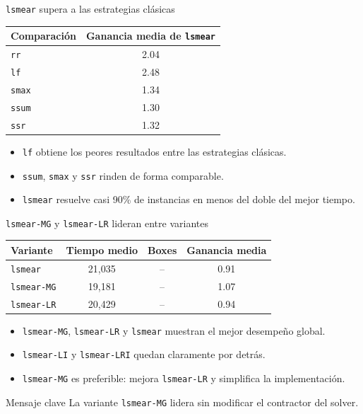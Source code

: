 \documentclass[10pt,aspectratio=169]{beamer}
\begin{document}
\begin{frame}{\texttt{lsmear} supera a las estrategias clásicas}
\small
\begin{center}
\begin{tabular}{@{}lc@{}}
\toprule
Comparación & Ganancia media de \texttt{lsmear} \\
\midrule
\texttt{rr}   & 2.04 \\
\texttt{lf}   & 2.48 \\
\texttt{smax} & 1.34 \\
\texttt{ssum} & \alert{1.30} \\
\texttt{ssr}  & 1.32 \\
\bottomrule
\end{tabular}
\end{center}

\begin{itemize}
  \item \texttt{lf} obtiene los peores resultados entre las estrategias clásicas.
  \item \texttt{ssum}, \texttt{smax} y \texttt{ssr} rinden de forma comparable.
  \item \texttt{lsmear} resuelve casi 90\% de instancias en menos del doble del mejor tiempo.
\end{itemize}
\end{frame}

\begin{frame}{\texttt{lsmear-MG} y \texttt{lsmear-LR} lideran entre variantes}
\small
\begin{center}
\begin{tabular}{@{}lccc@{}}
\toprule
Variante & Tiempo medio & Boxes & Ganancia media \\ \midrule
\texttt{lsmear}    & 21,035 & -- & 0.91 \\
\texttt{lsmear-MG} & \alert{19,181} & -- & \alert{1.07} \\
\texttt{lsmear-LR} & 20,429 & -- & 0.94 \\
\bottomrule
\end{tabular}
\end{center}

\begin{itemize}
  \item \texttt{lsmear-MG}, \texttt{lsmear-LR} y \texttt{lsmear} muestran el mejor desempeño global.
  \item \texttt{lsmear-LI} y \texttt{lsmear-LRI} quedan claramente por detrás.
  \item \texttt{lsmear-MG} es preferible: mejora \texttt{lsmear-LR} y simplifica la implementación.
\end{itemize}

\begin{alertblock}{Mensaje clave}
La variante \texttt{lsmear-MG} lidera sin modificar el contractor del solver.
\end{alertblock}
\end{frame}
\end{document}
